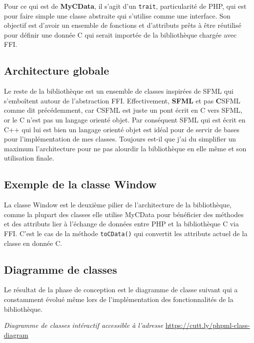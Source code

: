 \documentclass[11pt,a4paper,krantz2,11pt,oneside]{krantz}
\begin{document}
Pour ce qui est de \textbf{MyCData}, il s'agit d'un \texttt{trait}, particularité de PHP, qui est pour faire simple une classe abstraite qui s'utilise comme une interface. Son objectif est d'avoir un ensemble de fonctions et d'attributs prêts à être réutilisé pour définir une donnée C qui serait importée de la bibliothèque chargée avec FFI.

\hypertarget{architecture-globale}{%
\subsection{Architecture globale}\label{architecture-globale}}

Le reste de la bibliothèque est un ensemble de classes inspirées de SFML qui s'emboîtent autour de l'abstraction FFI. Effectivement, \textbf{SFML} et pas \textbf{C}SFML comme dit précédemment, car CSFML est juste un pont écrit en C vers SFML, or le C n'est pas un langage orienté objet. Par conséquent SFML qui est écrit en C++ qui lui est bien un langage orienté objet est idéal pour de servir de bases pour l'implémentation de mes classes. Toujours est-il que j'ai du simplifier un maximum l'architecture pour ne pas alourdir la bibliothèque en elle même et son utilisation finale.

\hypertarget{exemple-de-la-classe-window}{%
\subsection{Exemple de la classe Window}\label{exemple-de-la-classe-window}}

La classe Window est le deuxième pilier de l'architecture de la bibliothèque, comme la plupart des classes elle utilise MyCData pour bénéficier des méthodes et des attributs lier à l'échange de données entre PHP et la bibliothèque C via FFI. C'est le cas de la méthode \texttt{toCData()} qui convertit les attributs actuel de la classe en donnée C.

\hypertarget{diagramme-de-classes}{%
\subsection{Diagramme de classes}\label{diagramme-de-classes}}

Le résultat de la phase de conception est le diagramme de classe suivant qui a constamment évolué même lors de l'implémentation des fonctionnalités de la bibliothèque.

\label{fig:class-diagramm}\emph{Diagramme de classes intéractif accessible à l'adresse} \url{https://cutt.ly/phpml-class-diagram}
\end{document}
